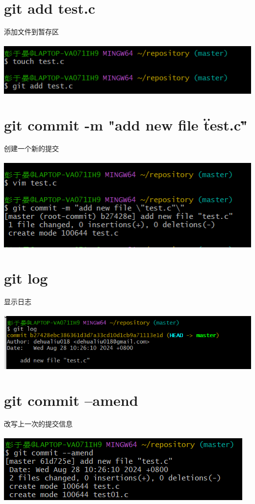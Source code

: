\documentclass[a4paper, 12pt]{article}
\begin{document}
\section{git add test.c}
添加文件到暂存区\\ \\
\includegraphics[width=1\linewidth]{3.png} 
  
\section{git commit -m "add new file \"test.c\""}
创建一个新的提交\\ \\
\includegraphics[width=1\linewidth]{4.png}
  
\section{git log}
显示日志\\ \\
\includegraphics[width=1\linewidth]{5.png}
  
\section{git commit --amend}
改写上一次的提交信息\\ \\
\includegraphics[width=1\linewidth]{6.png}
  
\end{document}
